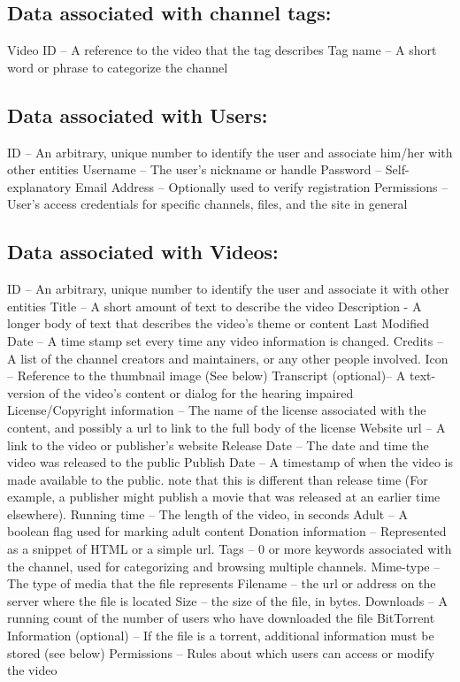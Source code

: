 \documentclass[a4paper,12pt]{report}
\begin{document}
\subsection{Data associated with channel tags:}
Video ID – A reference to the video that the tag describes
Tag name – A short word or phrase to categorize the channel

\subsection{Data associated with Users:}
ID – An arbitrary, unique number to identify the user and associate him/her with other entities
Username – The user's nickname or handle
Password – Self-explanatory
Email Address – Optionally used to verify registration
Permissions – User's access credentials for specific channels, files, and the site in general

\subsection{Data associated with Videos:}
ID – An arbitrary, unique number to identify the user and associate it with other entities
Title – A short amount of text to describe the video
Description - A longer body of text that describes the video's theme or content
Last Modified Date – A time stamp set every time any video information is changed.
Credits – A list of the channel creators and maintainers, or any other people involved.
Icon – Reference to the thumbnail image (See below)
Transcript (optional)– A text-version of the video's content or dialog for the hearing impaired
License/Copyright information – The name of the license associated with the content, and possibly a url to link to the full body of the license
Website url – A link to the video  or publisher's website
Release Date – The date and time the video was released to the public
Publish Date – A timestamp of when the video is made available to the public. note that this is different than release time (For example, a publisher might publish a movie that was released at an earlier time elsewhere).
Running time – The length of the video, in seconds
Adult – A boolean flag used for marking adult content
Donation information – Represented as a snippet of HTML or a simple url.
Tags – 0 or more keywords associated with the channel, used for categorizing and     browsing multiple channels.
Mime-type – The type of media that the file represents
Filename – the url or address on the server where the file is located
Size – the size of the file, in bytes.
Downloads – A running count of the number of users who have downloaded the file
BitTorrent Information (optional) – If the file is a torrent, additional information must be stored (see below)
Permissions – Rules about which users can access or modify the video
\end{document}
